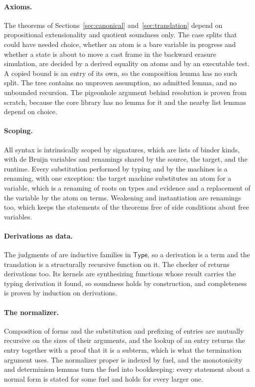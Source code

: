 \paragraph{Axioms.}
The theorems of Sections~\ref{sec:canonical} and~\ref{sec:translation} depend on propositional extensionality and quotient soundness only. The case splits that could have needed choice, whether an atom is a bare variable in progress and whether a state is about to move a cast frame in the backward erasure simulation, are decided by a derived equality on atoms and by an executable test. A copied bound is an entry of its own, so the composition lemma has no such split. The tree contains no unproven assumption, no admitted lemma, and no unbounded recursion. The pigeonhole argument behind resolution is proven from scratch, because the core library has no lemma for it and the nearby list lemmas depend on choice.

\paragraph{Scoping.}
All syntax is intrinsically scoped by signatures, which are lists of binder kinds, with de Bruijn variables and renamings shared by the source, the target, and the runtime. Every substitution performed by typing and by the machines is a renaming, with one exception: the target machine substitutes an atom for a variable, which is a renaming of roots on types and evidence and a replacement of the variable by the atom on terms. Weakening and instantiation are renamings too, which keeps the statements of the theorems free of side conditions about free variables.

\paragraph{Derivations as data.}
The judgments of \DOTMNF are inductive families in $\mathsf{Type}$, so a derivation is a term and the translation is a structurally recursive function on it. The checker of \FCdot returns derivations too. Its kernels are synthesizing functions whose result carries the typing derivation it found, so soundness holds by construction, and completeness is proven by induction on derivations.

\paragraph{The normalizer.}
Composition of forms and the substitution and prefixing of entries are mutually recursive on the sizes of their arguments, and the lookup of an entry returns the entry together with a proof that it is a subterm, which is what the termination argument uses. The normalizer proper is indexed by fuel, and the monotonicity and determinism lemmas turn the fuel into bookkeeping: every statement about a normal form is stated for some fuel and holds for every larger one.

